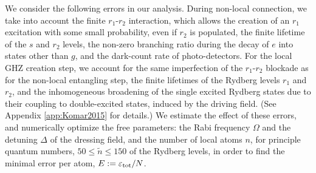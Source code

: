 We consider the following errors in our analysis. During
non-local connection, we take into account the finite $r_1$-$r_2$ interaction, which
allows the creation of an $r_1$ excitation with some small probability, even if
$r_2$ is populated, the finite lifetime of the $s$ and $r_2$ levels, the
non-zero branching ratio during the decay of $e$ into states other than $g$, and
the dark-count rate of photo-detectors. For the local GHZ creation step, we account
for the same imperfection of the
$r_1$-$r_2$ blockade as for the non-local entangling step, the finite lifetimes
of the Rydberg levels $r_1$ and $r_2$, and the inhomogeneous broadening of the
single excited Rydberg states due to their coupling to double-excited states,
induced by the driving field.
(See Appendix \ref{app:Komar2015} for details.) We estimate the effect of these
errors, and numerically optimize the free parameters: the Rabi frequency
$\Omega$ and the detuning $\Delta$ of the dressing field, and the
number of local atoms $n$, for principle quantum numbers, $50\leq \tilde n \leq
150$ of the Rydberg levels, in order to find the minimal
error per atom, $E := \varepsilon_\mathrm{tot}/N$.
 
